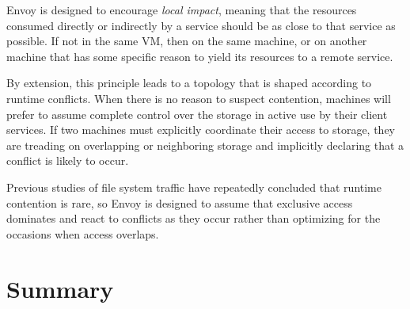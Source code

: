 Envoy is designed to encourage \emph{local impact}, meaning that the resources consumed directly or indirectly by a service should be as close to that service as possible. If not in the same VM, then on the same machine, or on another machine that has some specific reason to yield its resources to a remote service.

By extension, this principle leads to a topology that is shaped according to runtime conflicts. When there is no reason to suspect contention, machines will prefer to assume complete control over the storage in active use by their client services. If two machines must explicitly coordinate their access to storage, they are treading on overlapping or neighboring storage and implicitly declaring that a conflict is likely to occur.

Previous studies of file system traffic have repeatedly concluded that runtime contention is rare, so Envoy is designed to assume that exclusive access dominates and react to conflicts as they occur rather than optimizing for the occasions when access overlaps.

\section{Summary}
